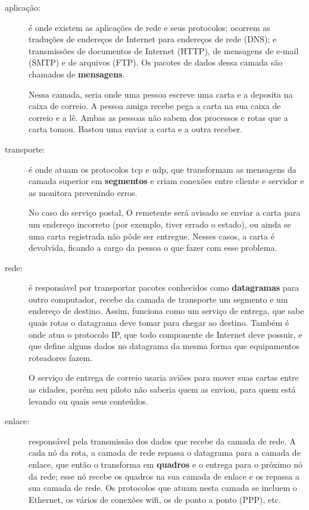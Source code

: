 \begin{description}
    \item[aplicação:] é onde existem as aplicações de rede e seus protocolos; ocorrem
        as traduções de endereços de Internet para endereços de rede (DNS); e
        transmissões de documentos de Internet (HTTP), de mensagens de e-mail (SMTP) e
        de arquivos (FTP). Os pacotes de dados dessa camada são chamados de
        \textbf{mensagens}.

        Nessa camada, seria onde uma pessoa escreve uma carta e a deposita na caixa de
        correio. A pessoa amiga recebe pega a carta na sua caixa de correio e a lê.
        Ambas as pessoas não sabem dos processos e rotas que a carta tomou. Bastou uma
        enviar a carta e a outra receber.

    \item[transporte:] é onde atuam os protocolos \gls{tcp} e \gls{udp}, que
        transformam as mensagens da camada superior em \textbf{segmentos} e criam
        conexões entre cliente e servidor e as monitora prevenindo erros.

        No caso do serviço postal, O remetente será avisado se enviar a carta para um
        endereço incorreto (por exemplo, tiver errado o estado), ou ainda se uma carta
        registrada não pôde ser entregue. Nesses casos, a carta é devolvida, ficando a
        cargo da pessoa o que fazer com esse problema.

    \item[rede:] é responsável por transportar pacotes conhecidos como
        \textbf{datagramas} para outro computador, recebe da camada de transporte um
        segmento e um endereço de destino. Assim, funciona como um serviço de entrega,
        que sabe quais rotas o datagrama deve tomar para chegar ao destino. Também é
        onde atua o protocolo IP, que todo componente de Internet deve possuir, e que
        define alguns dados no datagrama da mesma forma que equipamentos roteadores
        fazem.

        O serviço de entrega de correio usaria aviões para mover suas cartas entre as
        cidades, porém seu piloto não saberia quem as enviou, para quem está levando ou
        quais seus conteúdos.

    \item[enlace:] responsável pela transmissão dos dados que recebe da camada de rede.
        A cada nó da rota, a camada de rede repassa o datagrama para a camada de
        enlace, que então o transforma em \textbf{quadros} e o entrega para o próximo
        nó da rede; esse nó recebe os quadros na sua camada de enlace e os repassa a
        sua camada de rede. Os protocolos que atuam nesta camada se incluem o Ethernet,
        os vários de conexões wifi, os de ponto a ponto (PPP), etc.


\end{description}
